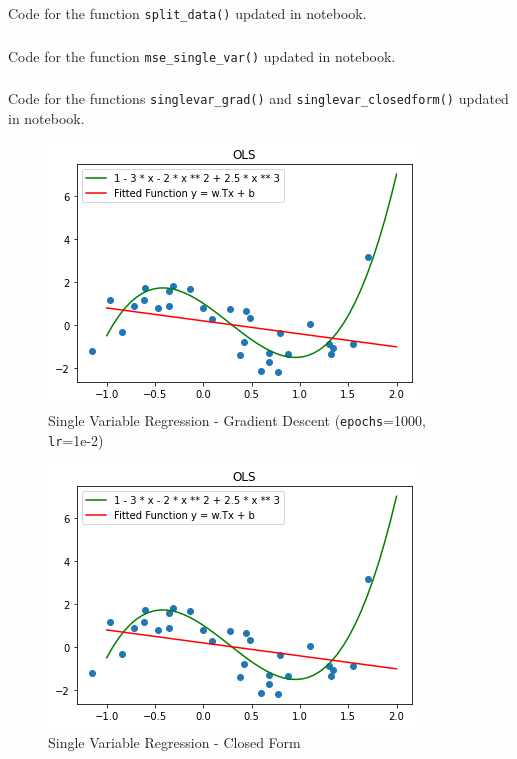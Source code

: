 \documentclass[12pt, fleqn]{article}
\begin{document}
\subsubsection{}
Code for the function \verb!split_data()! updated in notebook.

\subsubsection{}
Code for the function \verb!mse_single_var()! updated in notebook.

\subsubsection{}
Code for the functions \verb!singlevar_grad()! and \verb!singlevar_closedform()! updated in notebook.
\begin{figure}[H]
  \centering
  \includegraphics[scale=0.7]{singlevar_grad.png}
  \caption{Single Variable Regression - Gradient Descent (\texttt{epochs}=1000, \texttt{lr}=1e-2)}
\end{figure}
\begin{figure}[H]
  \centering
  \includegraphics[scale=0.7]{singlevar_closedform.png}
  \caption{Single Variable Regression - Closed Form}
\end{figure}
\end{document}

